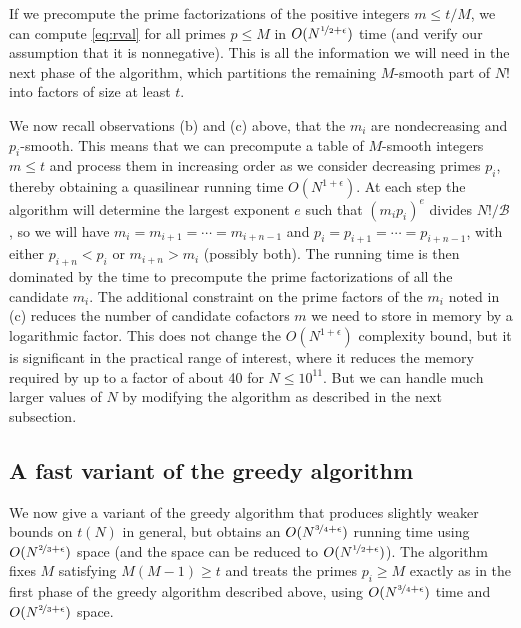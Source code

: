 \documentclass[10pt,a4paper,reqno]{amsart}
\numberwithin{equation}{section}
\theoremstyle{plain}
\theoremstyle{definition}
\newcommand\tuple{{\mathcal B}}
\begin{document}
If we precompute the prime factorizations of the positive integers $m\le t/M$, we can compute \eqref{eq:rval} for all primes $p \le M$ in $O(N^{\nicefrac{1}{2}+\epsilon})$ time (and verify our assumption that it is nonnegative).  This is all the information we will need in the next phase of the algorithm, which partitions the remaining $M$-smooth part of $N!$ into factors of size at least $t$.

We now recall observations (b) and (c) above, that the $m_i$ are nondecreasing and $p_i$-smooth.    This means that we can  precompute a table of $M$-smooth integers $m\le t$ and process them in increasing order as we consider decreasing primes $p_i$, thereby obtaining a quasilinear running time $O(N^{1+\epsilon})$. At each step the algorithm will determine the largest exponent $e$ such that $(m_i p_i)^e$ divides $N!/\tuple$, so we will have $m_i=m_{i+1}=\cdots = m_{i+n-1}$ and $p_i=p_{i+1}=\cdots = p_{i+n-1}$, with either $p_{i+n}<p_i$ or $m_{i+n} > m_i$ (possibly both).
The running time is then dominated by the time to precompute the prime factorizations of all the candidate $m_i$.  The additional constraint on the prime factors of the $m_i$ noted in (c) reduces the number of candidate cofactors $m$ we need to store in memory by a logarithmic factor.  This does not change the $O(N^{1+\epsilon})$ complexity bound, but it is significant in the practical range of interest, where it reduces the memory required by up to a factor of about 40 for $N\le 10^{11}$.  But we can handle much larger values of $N$ by modifying the algorithm as described in the next subsection.

\subsection{A fast variant of the greedy algorithm}\label{sec:fast-greedy}
We now give a variant of the greedy algorithm that produces slightly weaker bounds on $t(N)$ in general, but obtains an $O(N^{\nicefrac{3}{4}+\epsilon})$ running time using $O(N^{\nicefrac{2}{3}+\epsilon})$ space (and the space can be reduced to $O(N^{\nicefrac{1}{2}+\epsilon})$).  The algorithm fixes $M$ satisfying $M(M-1)\ge t$ and treats the primes $p_i\ge M$ exactly as in the first phase of the greedy algorithm described above, using $O(N^{\nicefrac{3}{4}+\epsilon})$ time and $O(N^{\nicefrac{2}{3}+\epsilon})$ space.
\end{document}

